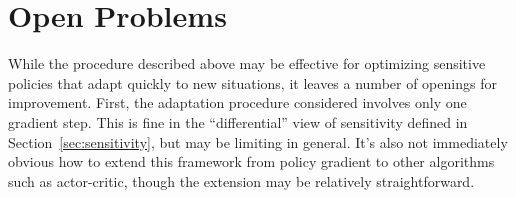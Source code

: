 \documentclass{article}
\begin{document}
\section{Open Problems}

While the procedure described above may be effective for optimizing sensitive policies that adapt quickly to new situations, it leaves a number of openings for improvement. First, the adaptation procedure considered involves only one gradient step. This is fine in the ``differential'' view of sensitivity defined in Section~\ref{sec:sensitivity}, but may be limiting in general. It's also not immediately obvious how to extend this framework from policy gradient to other algorithms such as actor-critic, though the extension may be relatively straightforward.
\end{document}
